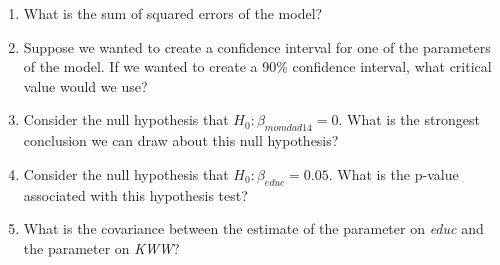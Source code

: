 \begin{enumerate}
\item What is the sum of squared errors of the model?

\item Suppose we wanted to create a confidence interval for one of the parameters of the model. If we wanted to create a 90\% confidence interval, what critical value would we use?

\item Consider the null hypothesis that $H_0:\beta_{momdad14}=0$. What is the strongest conclusion we can draw about this null hypothesis?

\item Consider the null hypothesis that $H_0:\beta_{educ}=0.05$. What is the p-value associated with this hypothesis test?

\item What is the covariance between the estimate of the parameter on \textit{educ} and the parameter on \textit{KWW}?


\end{enumerate}
